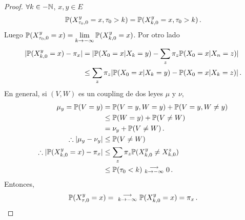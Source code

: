 \begin{proof}  %
\gris
$\forall k\in -\N$, $x,y\in E$
$$ \P(X^y_{\tau_0,0}=x,\tau_0>k) = \P(X^y_{k,0}=x,\tau_0>k) \,.$$
Luego $\P(X^y_{\tau_0,0}=x)=\displaystyle\lim_{k\to-\infty}\P(X^y_{k,0}=x)$. Por otro lado
\begin{alignat*}{2}
    |\P(X^y_{k,0}=x)-\pi_x| & = |\P(X_0=x|X_k=y)-\displaystyle\sum_z\pi_z\P(X_0=x|X_n=z)| \\
     & \leq \sum_{z}\pi_z|\P(X_0=x|X_k=y)-\P(X_0=x|X_k=z)|\,.
\end{alignat*}
En general, si $(V,W)$ es un coupling de dos leyes $\mu$ y $\nu$,
\begin{alignat*}{2}
\mu_y = \P(V=y) & = \P(V=y,W=y)+\P(V=y,W\neq y) \\
 & \leq \P(W=y)+\P(V\neq W) \\
 & = \nu_y + \P(V\neq W)\,. \\
 \therefore |\mu_y-\nu_y| & \leq \P(V\neq W) \\
 \therefore |\P(X^y_{k,0}=x)-\pi_x| & \leq \displaystyle\sum_z\pi_z\P(X^y_{k,0} \neq X^z_{k,0}) \\
 & \leq \P(\tau_0<k) \mbox{ }\substack{\longrightarrow \\ k\to-\infty}\mbox{ }0\, .
\end{alignat*}
Entonces,
$$ \P(X^y_{\tau,0}=x)=\mbox{ }\substack{\longrightarrow \\ k\to-\infty}\mbox{ }\P(X^y_{k,0}=x)=\pi_x \, .$$
\findem
\negro
\end{proof}
